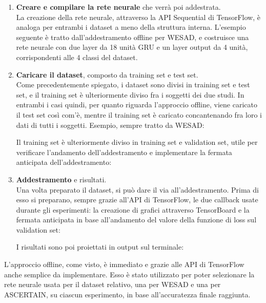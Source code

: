\begin{enumerate}
    \item \textbf{Creare e compilare la rete neurale} che verrà poi addestrata.\\
    La creazione della rete neurale, attraverso la API Sequential di TensorFlow, è analoga per entrambi i dataset a meno della struttura interna. L'esempio seguente è tratto dall'addestramento offline per WESAD, e costruisce una rete neurale con due layer da 18 unità GRU e un layer output da 4 unità, corrispondenti alle 4 classi del dataset.
    
    \item \textbf{Caricare il dataset}, composto da training set e test set.\\
    Come precedentemente spiegato, i dataset sono divisi in training set e test set, e il training set è ulteriormente diviso fra i soggetti dei due studi. In entrambi i casi quindi, per quanto riguarda l'approccio offline, viene caricato il test set così com'è, mentre il training set è caricato concantenando fra loro i dati di tutti i soggetti. Esempio, sempre tratto da WESAD:
    
    
    Il training set è ulteriormente diviso in training set e validation set, utile per verificare l'andamento dell'addestramento e implementare la fermata anticipata dell'addestramento:
    
    \item \textbf{Addestramento} e risultati.\\
    Una volta preparato il dataset, si può dare il via all'addestramento. Prima di esso si preparano, sempre grazie all'API di TensorFlow, le due callback usate durante gli esperimenti: la creazione di grafici attraverso TensorBoard e la fermata anticipata in base all'andamento del valore della funzione di loss sul validation set:
    
    I risultati sono poi proiettati in output sul terminale:
    
\end{enumerate}
L'approccio offline, come visto, è immediato e grazie alle API di TensorFlow anche semplice da implementare. Esso è stato utilizzato per poter selezionare la rete neurale usata per il dataset relativo, una per WESAD e una per ASCERTAIN, su ciascun esperimento, in base all'accuratezza finale raggiunta.

